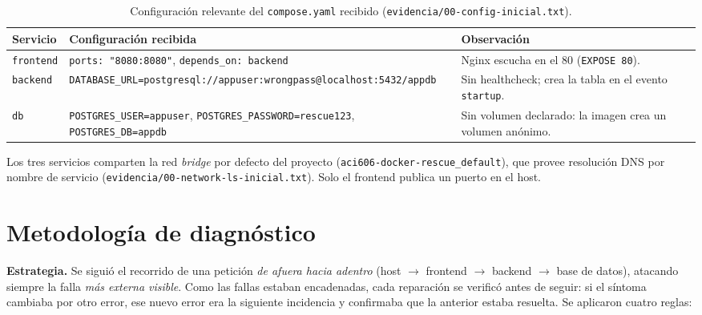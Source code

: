 \documentclass[11pt,a4paper]{article}
\newcommand{\ev}[1]{{\small\nolinkurl{evidencia/#1}}}
\newcommand{\cod}[1]{\texttt{#1}}
\newcommand{\ruta}[1]{\nolinkurl{#1}}
\begin{document}
\begin{table}[H]
\centering\small
\begin{tabularx}{\linewidth}{@{}l >{\raggedright\arraybackslash}X >{\raggedright\arraybackslash}p{5.2cm}@{}}
\toprule
\textbf{Servicio} & \textbf{Configuración recibida} & \textbf{Observación} \\
\midrule
\cod{frontend} & \cod{ports: "8080:8080"}, \cod{depends\_on: backend} & Nginx escucha en el 80 (\cod{EXPOSE 80}). \\
\cod{backend}  & \cod{DATABASE\_URL=}\nolinkurl{postgresql://appuser:wrongpass@localhost:5432/appdb} & Sin healthcheck; crea la tabla en el evento \cod{startup}. \\
\cod{db}       & \cod{POSTGRES\_USER=appuser}, \cod{POSTGRES\_PASSWORD=rescue123}, \cod{POSTGRES\_DB=appdb} & Sin volumen declarado: la imagen crea un volumen anónimo. \\
\bottomrule
\end{tabularx}
\caption{Configuración relevante del \cod{compose.yaml} recibido (\ev{00-config-inicial.txt}).}
\end{table}

Los tres servicios comparten la red \emph{bridge} por defecto del proyecto (\ruta{aci606-docker-rescue_default}), que provee resolución DNS por nombre de servicio (\ev{00-network-ls-inicial.txt}). Solo el frontend publica un puerto en el host.

\section{Metodología de diagnóstico}

\textbf{Estrategia.} Se siguió el recorrido de una petición \emph{de afuera hacia adentro} (host $\to$ frontend $\to$ backend $\to$ base de datos), atacando siempre la falla \emph{más externa visible}. Como las fallas estaban encadenadas, cada reparación se verificó antes de seguir: si el síntoma cambiaba por otro error, ese nuevo error era la siguiente incidencia y confirmaba que la anterior estaba resuelta. Se aplicaron cuatro reglas:
\end{document}
